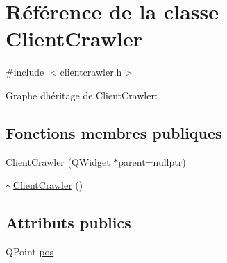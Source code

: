 \hypertarget{class_client_crawler}{}\section{Référence de la classe Client\+Crawler}
\label{class_client_crawler}


{\ttfamily \#include $<$clientcrawler.\+h$>$}



Graphe d\textquotesingle{}héritage de Client\+Crawler\+:
\subsection*{Fonctions membres publiques}
\begin{DoxyCompactItemize}
\item 
\hyperlink{class_client_crawler_a07b217751bd9e1b100330453605a8d7d}{Client\+Crawler} (Q\+Widget $\ast$parent=nullptr)
\item 
\hyperlink{class_client_crawler_af66de2d9f7a09978c1deb87c2771df3e}{$\sim$\+Client\+Crawler} ()
\end{DoxyCompactItemize}
\subsection*{Attributs publics}
\begin{DoxyCompactItemize}
\item 
Q\+Point \hyperlink{class_client_crawler_a0cf23901bc90495a8ca6fcdff7a31379}{pos}
\end{DoxyCompactItemize}
